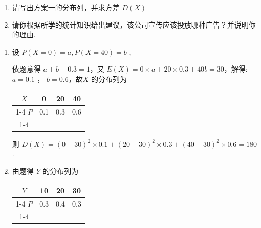 \begin{enumerate}
\begin{enumerate}
        \begin{enumerate}
            \item 请写出方案一的分布列，并求方差 $D\left( X\right)$
            \item 请你根据所学的统计知识给出建议，该公司宣传应该投放哪种广告？并说明你的理由.
        \end{enumerate}
        \begin{jieda}
            \begin{enumerate}
                \item 设 $P\left( {X = 0}\right)  = a,P\left( {X = {40}}\right)  = b$ ,

                依题意得 $a + b + {0.3} = 1$，又 $E\left( X\right)  = 0 \times  a + {20} \times  {0.3} + {40b} = {30}$，解得: $a = {0.1}$ ， $b = {0.6}$，故$X$ 的分布列为
                
                \begin{center}
                
                \begin{tabular}{|c|c|c|c|}
                \hline
                $X$ & 0 & 20 & 40 \\
                \cline{1-4}
                $P$ & 0.1 & 0.3 & 0.6 \\
                \cline{1-4}
                \hline
                \end{tabular}
                
                \end{center}
                
                则 $D\left( X\right)  = {\left( 0 - {30}\right) }^{2} \times  {0.1} + {\left( {20} - {30}\right) }^{2} \times  {0.3} + {\left( {40} - {30}\right) }^{2} \times  {0.6} = {180}$ .
                \item 由题得 $Y$ 的分布列为
                
                \begin{center}
                
                \begin{tabular}{|c|c|c|c|}
                \hline
                $Y$ & 10 & 20 & 30 \\
                \cline{1-4}
                $P$ & 0.3 & 0.4 & 0.3 \\
                \cline{1-4}
                \hline
                \end{tabular}
                
                \end{center}
                

\end{enumerate}
\end{jieda}
\end{enumerate}
\end{enumerate}
